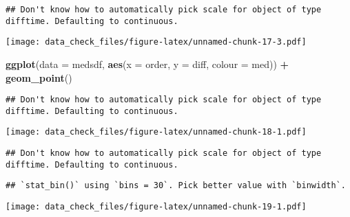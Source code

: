 \documentclass[]{article}
\newenvironment{Shaded}{\begin{snugshade}}{\end{snugshade}}
\newcommand{\DataTypeTok}[1]{\textcolor[rgb]{0.13,0.29,0.53}{#1}}
\newcommand{\DecValTok}[1]{\textcolor[rgb]{0.00,0.00,0.81}{#1}}
\newcommand{\KeywordTok}[1]{\textcolor[rgb]{0.13,0.29,0.53}{\textbf{#1}}}
\newcommand{\NormalTok}[1]{#1}
\newcommand{\OperatorTok}[1]{\textcolor[rgb]{0.81,0.36,0.00}{\textbf{#1}}}
\newcommand{\StringTok}[1]{\textcolor[rgb]{0.31,0.60,0.02}{#1}}
\begin{document}
\begin{verbatim}
## Don't know how to automatically pick scale for object of type difftime. Defaulting to continuous.
\end{verbatim}

\texttt{[image: data\_check\_files/figure-latex/unnamed-chunk-17-3.pdf]}

\begin{Shaded}
\begin{Highlighting}[]
\KeywordTok{ggplot}\NormalTok{(}\DataTypeTok{data =}\NormalTok{ medsdf, }\KeywordTok{aes}\NormalTok{(}\DataTypeTok{x =}\NormalTok{ order, }\DataTypeTok{y =}\NormalTok{ diff, }\DataTypeTok{colour =}\NormalTok{ med)) }\OperatorTok{+}
\StringTok{  }\KeywordTok{geom_point}\NormalTok{()}
\end{Highlighting}
\end{Shaded}

\begin{verbatim}
## Don't know how to automatically pick scale for object of type difftime. Defaulting to continuous.
\end{verbatim}

\texttt{[image: data\_check\_files/figure-latex/unnamed-chunk-18-1.pdf]}

\begin{Shaded}
\end{Shaded}

\begin{verbatim}
## Don't know how to automatically pick scale for object of type difftime. Defaulting to continuous.
\end{verbatim}

\begin{verbatim}
## `stat_bin()` using `bins = 30`. Pick better value with `binwidth`.
\end{verbatim}

\texttt{[image: data\_check\_files/figure-latex/unnamed-chunk-19-1.pdf]}
\end{document}
